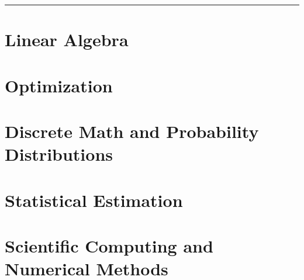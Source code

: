 \documentclass{article}
\begin{document}
	
	\setlength\abovedisplayskip{0.1cm}
	\setlength\belowdisplayskip{0.1cm}
	\setlength\abovedisplayshortskip{0.1cm}
	\setlength\belowdisplayshortskip{0.1cm}
	
	\begin{multicols*}{0}
		\setcounter{tocdepth}{1}
		\tableofcontents
		\thispagestyle{firstpage}
		
		\smallskip
		
		\hrule
		
		\vfill\null
		\columnbreak
		
		
		
		\vfill\null
		\columnbreak
		\section{Linear Algebra}
		
		\vfill\null
		\columnbreak
		\section{Optimization}
		
		\section{Discrete Math and Probability Distributions}
		
		\section{Statistical Estimation}
		
		\section{Scientific Computing and Numerical Methods}
		
	\end{multicols*}
\end{document}
